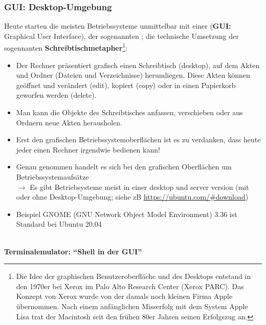 \subsubsection*{GUI: Desktop-Umgebung}
Heute starten die meisten Betriebssysteme unmittelbar mit einer  (\textbf{GUI:} Graphical User Interface), der sogenannten ; die technische Umsetzung der sogennanten \textbf{Schreibtischmetapher}\footnote{Die Idee der graphischen Benutzeroberfläche und des Desktops entstand in den 1970er bei Xerox im Palo Alto Research Center (Xerox PARC). Das Konzept von Xerox wurde von der damals noch kleinen Firma Apple übernommen. Nach einem anfänglichen Misserfolg mit dem System Apple Lisa trat der Macintosh seit den frühen 80er Jahren seinen Erfolgszug an.}: 
\begin{itemize}
	\item Der Rechner präsentiert grafisch einen Schreibtisch (desktop), auf dem Akten und Ordner (Dateien und Verzeichnisse) herumliegen. Diese Akten können geöffnet und verändert (edit), kopiert (copy) oder in einen Papierkorb geworfen werden (delete). 
	\item Man kann die Objekte des Schreibtisches anfassen, verschieben oder aus Ordnern neue Akten herausholen.
\end{itemize} 
\begin{itemize}
	\item Erst den grafischen Betriebssystemoberflächen ist es zu verdanken, dass heute
	jeder einen Rechner irgendwie bedienen kann!%
	\item 	Genau genommen handelt es sich bei den grafischen Oberflächen um Betriebssystemaufsätze\\
	$\to$ Es gibt Betriebsysteme meist in einer desktop und server version (mit oder ohne Desktop-Umgebung; siehe zB \url{https://ubuntu.com/\#download}) 
	\item Beispiel GNOME (GNU Network Object Model Environment) 3.36 ist Standard bei Ubuntu 20.04 
\end{itemize}
%
~\\
\textbf{Terminalemulator: ``Shell in der GUI''}\\
